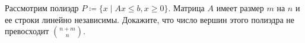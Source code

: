 Рассмотрим полиэдр $P \coloneqq \{x \mid Ax \le b, x \ge 0\}$. Матрица $A$ имеет размер $m$ на $n$ и ее
строки линейно независимы. Докажите, что число вершин этого полиэдра не превосходит $\binom{n + m}{n}$.
